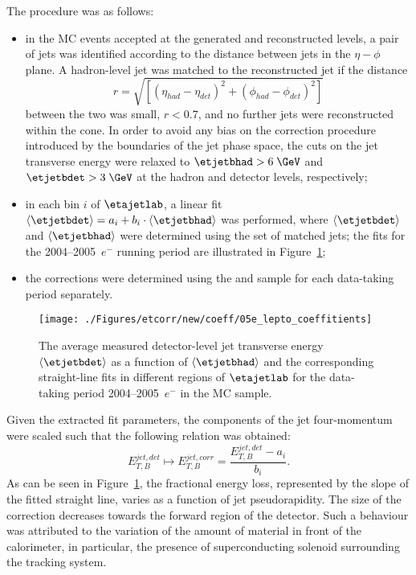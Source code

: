 The procedure was as follows:
\begin{itemize}
 \item in the MC events accepted at the generated and reconstructed levels, a pair of jets was identified according to the distance between jets in the $\eta-\phi$ plane. A hadron-level jet was matched to the reconstructed jet if the distance 
\begin{equation}
r=\sqrt{\left[\left(\eta_{had}-\eta_{det}\right)^2 + \left(\phi_{had}-\phi_{det}\right)^2\right]}
\end{equation}
between the two was small, $r<0.7$, and no further jets were reconstructed within the cone. In order to avoid any bias on the correction procedure introduced by the boundaries of the jet phase space, the cuts on the jet transverse energy were relaxed to $\etjetbhad>6\;\GeV$ and $\etjetbdet>3\;\GeV$ at the hadron and detector levels, respectively;
 \item in each bin $i$ of $\etajetlab$, a linear fit $\left\langle\etjetbdet\right\rangle = a_i + b_i\cdot\left\langle\etjetbhad\right\rangle$ was performed, where $\left\langle\etjetbdet\right\rangle$ and $\left\langle\etjetbhad\right\rangle$ were determined using the set of matched jets; the fits for the 2004--2005~$e^-$ running period are illustrated in Figure~\ref{fig:05e_lepto_coeffitients};
 \item the corrections were determined using the \ariadne and \lepto sample for each data-taking period separately. 
\end{itemize}
\begin{figure}[p]
\centering
\texttt{[image: ./Figures/etcorr/new/coeff/05e\_lepto\_coeffitients]}
\caption{The average measured detector-level jet transverse energy $\left\langle\etjetbdet\right\rangle$ as a function of $\left\langle\etjetbhad\right\rangle$ and the corresponding straight-line fits in different regions of $\etajetlab$ for the data-taking period 2004--2005~$e^-$ in the \lepto MC sample.}
\label{fig:05e_lepto_coeffitients}
\end{figure}

Given the extracted fit parameters, the components of the jet four-momentum were scaled such that the following relation was obtained:
 \begin{equation}
  E_{T,B}^{jet,det} \mapsto E_{T,B}^{jet,corr} = \frac{E_{T,B}^{jet,det} - a_i}{b_i}.
 \end{equation}
As can be seen in Figure~\ref{fig:05e_lepto_coeffitients}, the fractional energy loss, represented by the slope of the fitted straight line, varies as a function of jet pseudorapidity. The size of the correction decreases towards the forward region of the detector. Such a behaviour was attributed to the variation of the amount of material in front of the calorimeter, in particular, the presence of superconducting solenoid surrounding the tracking system. 

